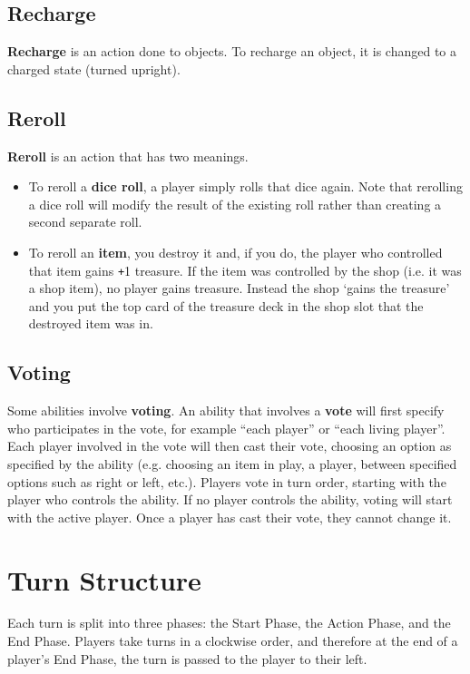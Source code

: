 \documentclass[a4paper, twoside]{report} %
\def\plus{\texttt{+}}
\begin{document}
    \section{Recharge}
    \textbf{Recharge} is an action done to objects. To recharge an object, it is changed to a charged state (turned upright).
    \section{Reroll}
    \textbf{Reroll} is an action that has two meanings.

    \begin{itemize}
        \item To reroll a \textbf{dice roll}, a player simply rolls that dice again. Note that rerolling a dice roll will modify the result of the existing roll rather than creating a second separate roll.
        \item To reroll an \textbf{item}, you destroy it and, if you do, the player who controlled that item gains \plus1 treasure. If the item was controlled by the shop (i.e. it was a shop item), no player gains treasure. Instead the shop ‘gains the treasure’ and you put the top card of the treasure deck in the shop slot that the destroyed item was in.
    \end{itemize}
    \section{Voting}
    Some abilities involve \textbf{voting}. An ability that involves a \textbf{vote} will first specify who participates in the vote, for example “each player” or “each living player”. Each player involved in the vote will then cast their vote, choosing an option as specified by the ability (e.g. choosing an item in play, a player, between specified options such as right or left, etc.). Players vote in turn order, starting with the player who controls the ability. If no player controls the ability, voting will start with the active player. Once a player has cast their vote, they cannot change it.

    \chapter{Turn Structure}
    \label{turn}
    Each turn is split into three phases: the Start Phase, the Action Phase, and the End Phase. Players take turns in a clockwise order, and therefore at the end of a player’s End Phase, the turn is passed to the player to their left.
\end{document}
